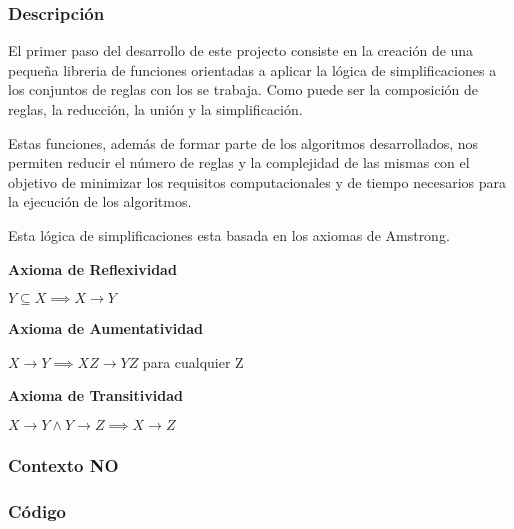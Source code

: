 \subsubsection{Descripci\'on} 
El primer paso del desarrollo de este projecto consiste en la creaci\'on de una peque\~na libreria de funciones
orientadas a aplicar la l\'ogica de simplificaciones a los conjuntos de reglas con los se trabaja. Como 
puede ser la composici\'on de reglas, la reducci\'on, la uni\'on y la simplificaci\'on.

Estas funciones, adem\'as de formar parte de los algoritmos desarrollados, nos permiten reducir el n\'umero de 
reglas y la complejidad de las mismas con el objetivo de minimizar los requisitos computacionales y de tiempo
necesarios para la ejecuci\'on de los algoritmos.

Esta l\'ogica de simplificaciones esta basada en los axiomas de Amstrong.

\textbf{Axioma de Reflexividad}

\begin{center}
    \(Y \subseteq X \implies X \to Y \)
\end{center}

\textbf{Axioma de Aumentatividad}

\begin{center}
    \(X \to Y \implies XZ \to YZ \) para cualquier Z
\end{center}

\textbf{Axioma de Transitividad}

\begin{center}
    \(X \to Y \wedge Y \to Z \implies X \to Z \)
\end{center}



\subsubsection{Contexto NO} 
\newpage
\subsubsection{C\'odigo} 

